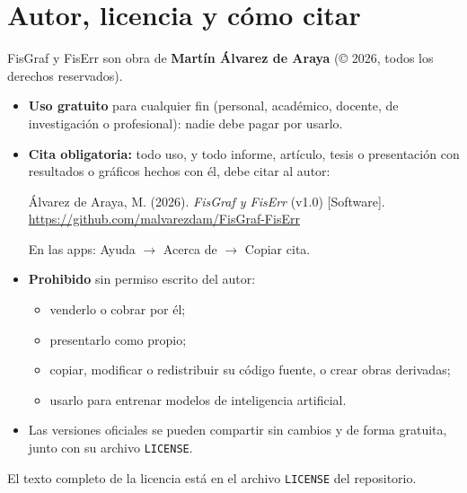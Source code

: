 \documentclass[11pt,a4paper]{article}
\newcommand{\code}[1]{\texttt{#1}}
\newcommand{\menu}[1]{\textsf{#1}}
\begin{document}
\section{Autor, licencia y cómo citar}\label{sec:licencia}

FisGraf y FisErr son obra de \textbf{Martín Álvarez de Araya} (© 2026, todos los derechos reservados).

\begin{itemize}
  \item \textbf{Uso gratuito} para cualquier fin (personal, académico, docente, de investigación o profesional): nadie debe pagar por usarlo.
  \item \textbf{Cita obligatoria:} todo uso, y todo informe, artículo, tesis o presentación con resultados o gráficos hechos con él, debe citar al autor:
  \begin{center}
  Álvarez de Araya, M. (2026). \emph{FisGraf y FisErr} (v1.0) [Software].\\ \url{https://github.com/malvarezdam/FisGraf-FisErr}
  \end{center}
  En las apps: \menu{Ayuda $\rightarrow$ Acerca de $\rightarrow$ Copiar cita}.
  \item \textbf{Prohibido} sin permiso escrito del autor:
  \begin{itemize}
    \item venderlo o cobrar por él;
    \item presentarlo como propio;
    \item copiar, modificar o redistribuir su código fuente, o crear obras derivadas;
    \item usarlo para entrenar modelos de inteligencia artificial.
  \end{itemize}
  \item Las versiones oficiales se pueden compartir sin cambios y de forma gratuita, junto con su archivo \code{LICENSE}.
\end{itemize}

El texto completo de la licencia está en el archivo \code{LICENSE} del repositorio.
\end{document}
